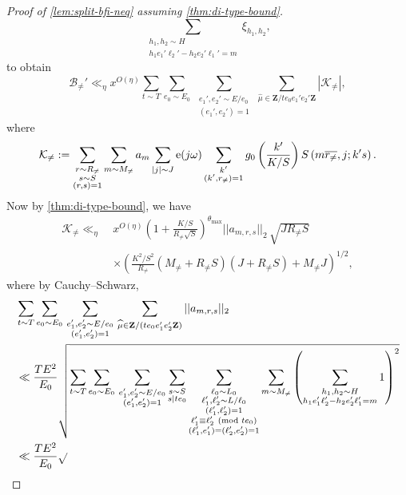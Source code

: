 \documentclass[reqno,11pt]{amsart}
\theoremstyle{definition}
\theoremstyle{remark}
\numberwithin{equation}{section}
\newcommand{\Z}{\mathbf{Z}}
\newcommand{\mK}{\mathcal{K}}
\newcommand{\mB}{\mathcal{B}}
\newcommand{\e}{\textnormal{e}}
\renewcommand{\bar}{\overline}
\renewcommand{\hat}{\widehat}
\renewcommand{\pmod}[1]{\ (\textnormal{mod } #1)}
\begin{document}
\begin{proof}[Proof of \cref{lem:split-bfi-neq} assuming \cref{thm:di-type-bound}]
\[    \sum_{\substack{h_1, h_2 \sim H \\ h_1e_1'\ell_2' - h_2e_2'\ell_1' = m}} 
    \xi_{h_1, h_2},
\]
to obtain
\begin{equation} \label{eq:bneqprime-bound}
    \mB_{\neq}' \ll_\eta x^{O(\eta)} 
    \sum_{t \sim T} \sum_{e_0 \sim E_0}\,
    \sum_{\substack{e_1', e_2' \sim E/e_0 \\ (e_1', e_2') = 1}}\,
    \sum_{\hat{\mu} \in \Z/te_0e_1'e_2'\Z}
    |\mK_{\neq}|,
\end{equation}
where
\[
    \mK_{\neq} := \sum_{\substack{r \sim R_{\neq} \\ s \sim S \\ (r, s) = 1}} 
    \sum_{m \sim M_{\neq}} a_m
    \sum_{|j| \sim J} \e(j \omega)
    \sum_{\substack{k' \\ (k', r_{\neq}) = 1}} 
    g_0 \left(\frac{k'}{K/S}\right) S\left(m\bar{r_{\neq}}, j; k's\right).
\]
Now by \cref{thm:di-type-bound}, we have
\[
\begin{aligned}
    \mK_{\neq} 
    \ll_\eta\ &x^{O(\eta)}
    \left(1 + \frac{K/S}{R_{\neq} \sqrt{S}}\right)^{\theta_{\max}}
    ||a_{m,r,s}||_2\, \sqrt{J R_{\neq} S}
    \\
    &\times 
    \left(\frac{K^2/S^2}{R_{\neq}} \left(M_{\neq} + R_{\neq} S\right)\left(J + R_{\neq} S\right) + M_{\neq}J \right)^{1/2},
\end{aligned}
\]
where by Cauchy--Schwarz,
\[
\begin{aligned}
    &\sum_{t \sim T} \sum_{e_0 \sim E_0}\,
    \sum_{\substack{e_1', e_2' \sim E/e_0 \\ (e_1', e_2') = 1}}\,
    \sum_{\hat{\mu} \in \Z/(te_0e_1'e_2'\Z)} ||a_{m,r,s}||_2
    \\ 
    &\ll 
    \frac{TE^2}{E_0} \sqrt{
    \sum_{t \sim T} \sum_{e_0 \sim E_0}\,
    \sum_{\substack{e_1', e_2' \sim E/e_0 \\ (e_1', e_2') = 1}} \sum_{\substack{s \sim S \\ s \mid te_0}} \sum_{\substack{\ell_0 \sim L_0 \\ \ell_1', \ell_2' \sim L/\ell_0 \\ (\ell_1', \ell_2') = 1 \\ \ell_1' \equiv \ell_2' \pmod{te_0} \\ (\ell_1', e_1') = (\ell_2', e_2') = 1}} 
    \sum_{m \sim M_{\neq}} 
    \left(\sum_{\substack{h_1, h_2 \sim H \\ h_1 e_1' \ell_2' - h_2 e_2' \ell_1' = m}} 1\right)^2
    } 
    \\
    &\ll \frac{TE^2}{E_0} \sqrt{
}
\end{aligned}\]
\end{proof}
\end{document}

